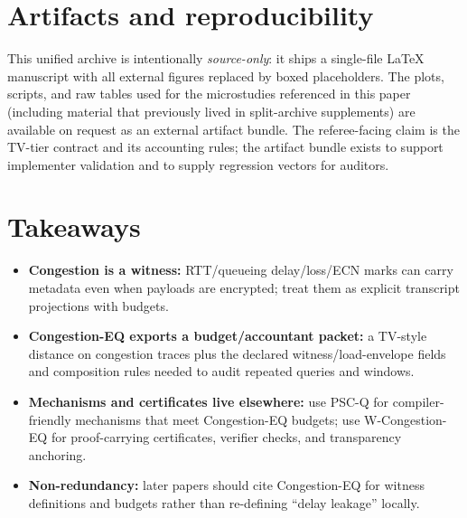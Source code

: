 \documentclass[11pt]{article}
\theoremstyle{definition}
\theoremstyle{remark}
\begin{document}
\section{Artifacts and reproducibility}
This unified archive is intentionally \emph{source-only}: it ships a single-file \LaTeX{} manuscript with all external figures replaced by boxed placeholders.
The plots, scripts, and raw tables used for the microstudies referenced in this paper (including material that previously lived in split-archive supplements) are available on request as an external artifact bundle.
The referee-facing claim is the TV-tier contract and its accounting rules; the artifact bundle exists to support implementer validation and to supply regression vectors for auditors.

\section{Takeaways}
\begin{itemize}[leftmargin=*]
\item \textbf{Congestion is a witness:} RTT/queueing delay/loss/ECN marks can carry metadata even when payloads are encrypted; treat them as explicit transcript projections with budgets.
\item \textbf{Congestion-EQ exports a budget/accountant packet:} a TV-style distance on congestion traces plus the declared witness/load-envelope fields and composition rules needed to audit repeated queries and windows.
\item \textbf{Mechanisms and certificates live elsewhere:} use PSC-Q for compiler-friendly mechanisms that meet Congestion-EQ budgets; use W-Congestion-EQ for proof-carrying certificates, verifier checks, and transparency anchoring.
\item \textbf{Non-redundancy:} later papers should cite Congestion-EQ for witness definitions and budgets rather than re-defining ``delay leakage'' locally.
\end{itemize}
\end{document}
